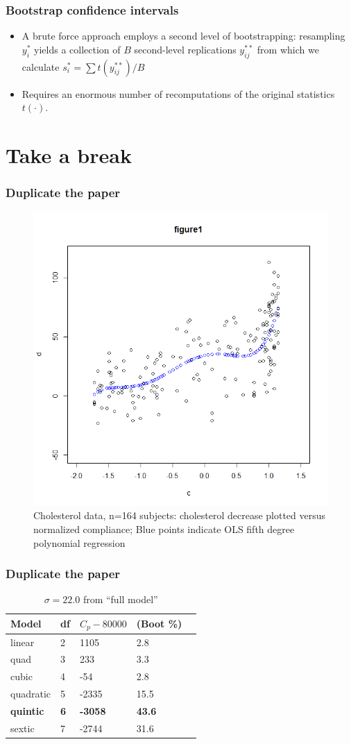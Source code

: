 \documentclass{beamer}
\begin{document}
\begin{frame}
\frametitle{Bootstrap confidence intervals}
\begin{itemize}
\item A brute force approach employs a second level of bootstrapping: resampling $y_i ^*$ yields a collection of $B$ second-level replications $y_{ij} ^{**}$ from which we calculate $s_i ^* = \sum t(y_{ij} ^{**}) / B$
\item Requires an enormous number of recomputations of the original statistics $t(\cdot)$.
\end{itemize}
\end{frame}
\section{Take a break}
\begin{frame}
\frametitle{Duplicate the paper}
\begin{figure}[h]
\centering
\includegraphics[width=200bp, height= 180bp]{figure1.png}
\caption{Cholesterol data, n=164 subjects: cholesterol decrease plotted versus normalized compliance; Blue points indicate OLS fifth degree polynomial regression}
\end{figure}
\end{frame}
\begin{frame}
\frametitle{Duplicate the paper}
\begin{table}[]
\centering
\caption{$\sigma=22.0$ from ``full model''}
\label{my-label}
\begin{tabular}{lllll}
\hline
{Model}   & {df} & {$C_p-80000$} & {(Boot \%)}\\ \hline
linear           & 2           & 1105                 & 2.8                        \\
quad             & 3           & 233                  & 3.3                       \\
cubic            & 4           & -54                  & 2.8                      \\
quadratic        & 5           & -2335                & 15.5          \\
\textbf{quintic} & \textbf{6}  & \textbf{-3058}       & \textbf{43.6}                 \\
sextic           & 7           & -2744                & 31.6                \\ \hline
\end{tabular}
\end{table}
\end{frame}
\end{document}
